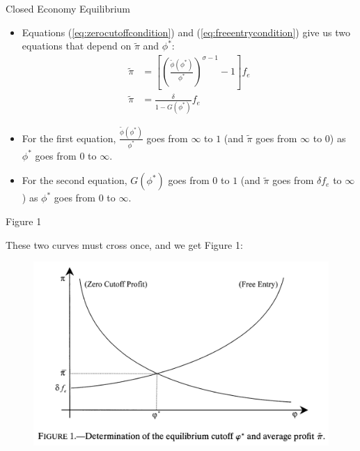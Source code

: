 \documentclass[aspectratio=169]{beamer}
\begin{document}
\begin{frame}{Closed Economy Equilibrium}

\begin{itemize}
    \item<1-> Equations (\ref{eq:zerocutoffcondition}) and (\ref{eq:freeentrycondition}) give us two equations that depend on $ \tilde{\pi} $ and $ \phi^{*} $:
    \begin{equation*}
        \begin{split}
             \tilde{\pi} &= \left[ \left( \frac{\tilde{\phi}\left( \phi^{*} \right)}{\phi^{*}} \right)^{\sigma - 1} - 1 \right] f_{e} \\
             \tilde{\pi} &= \frac{\delta}{1 - G\left( \phi^{*} \right)} f_{e}
        \end{split}
    \end{equation*}
    \item<2-> For the first equation, $ \frac{\tilde{\phi}\left( \phi^{*} \right)}{\phi^{*}} $ goes from $ \infty $  to $ 1 $ (and $ \tilde{\pi} $ goes from $ \infty $  to $ 0 $) as $ \phi^{*} $ goes from $ 0 $ to $ \infty $.
    \item<3-> For the second equation, $ G\left( \phi^{*} \right) $ goes from $ 0 $ to $ 1 $ (and $ \tilde{\pi} $ goes from $ \delta f_{e} $ to $ \infty $) as $ \phi^{*} $ goes from $ 0 $ to $ \infty $. 
\end{itemize}
    
\end{frame}


\begin{frame}{Figure 1}

These two curves must cross once, and we get Figure 1:

\begin{figure}
    \centering
    \includegraphics{MelitzFig1.jpg}
    \label{fig:Fig1}
\end{figure}
    
\end{frame}
\end{document}

